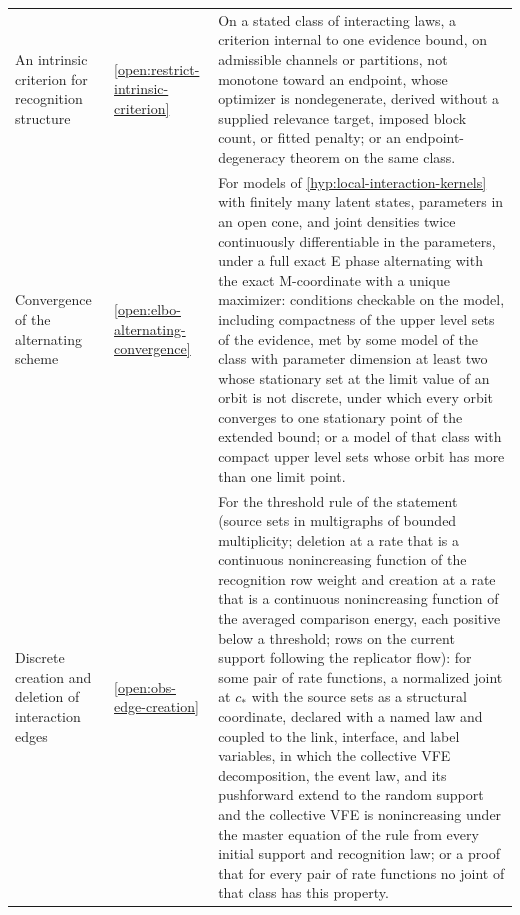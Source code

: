 {\begin{longtable}{@{}>{\raggedright\arraybackslash}p{}
>{\raggedright\arraybackslash}p{}
>{\raggedright\arraybackslash}p{}@{}}
An intrinsic criterion for recognition structure & \cref{open:restrict-intrinsic-criterion} & On a stated class of interacting laws, a criterion internal to one evidence bound, on admissible channels or partitions, not monotone toward an endpoint, whose optimizer is nondegenerate, derived without a supplied relevance target, imposed block count, or fitted penalty; or an endpoint-degeneracy theorem on the same class. \\
Convergence of the alternating scheme & \cref{open:elbo-alternating-convergence} & For models of \cref{hyp:local-interaction-kernels} with finitely many latent states, parameters in an open cone, and joint densities twice continuously differentiable in the parameters, under a full exact E phase alternating with the exact M-coordinate with a unique maximizer: conditions checkable on the model, including compactness of the upper level sets of the evidence, met by some model of the class with parameter dimension at least two whose stationary set at the limit value of an orbit is not discrete, under which every orbit converges to one stationary point of the extended bound; or a model of that class with compact upper level sets whose orbit has more than one limit point. \\
Discrete creation and deletion of interaction edges & \cref{open:obs-edge-creation} & For the threshold rule of the statement (source sets in multigraphs of bounded multiplicity; deletion at a rate that is a continuous nonincreasing function of the recognition row weight and creation at a rate that is a continuous nonincreasing function of the averaged comparison energy, each positive below a threshold; rows on the current support following the replicator flow): for some pair of rate functions, a normalized joint at $c_*$ with the source sets as a structural coordinate, declared with a named law and coupled to the link, interface, and label variables, in which the collective VFE decomposition, the event law, and its pushforward extend to the random support and the collective VFE is nonincreasing under the master equation of the rule from every initial support and recognition law; or a proof that for every pair of rate functions no joint of that class has this property. \\

\end{longtable}}
